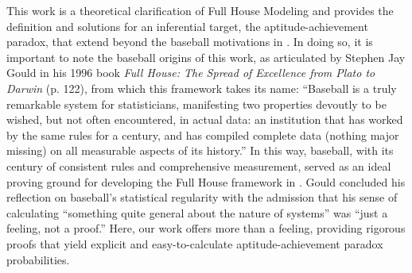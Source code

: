 \documentclass[12pt]{article}
\begin{document}
This work is a theoretical clarification of Full House Modeling and provides the definition and solutions for an inferential target, the aptitude-achievement paradox, that extend beyond the baseball motivations in \cite{yan2025comparing}. In doing so, it is important to note the baseball origins of this work, as articulated by Stephen Jay Gould in his 1996 book \emph{Full House: The Spread of Excellence from Plato to Darwin} (p. 122), from which this framework takes its name: ``Baseball is a truly remarkable system for statisticians, manifesting two properties devoutly to be wished, but not often encountered, in actual data: an institution that has worked by the same rules for a century, and has compiled complete data (nothing major missing) on all measurable aspects of its history.'' In this way, baseball, with its century of consistent rules and comprehensive measurement, served as an ideal proving ground for developing the Full House framework in \cite{yan2025comparing}. 
Gould concluded his reflection on baseball's statistical regularity with the admission that his sense of calculating ``something quite general about the nature of systems'' was ``just a feeling, not a proof.'' Here, our work offers more than a feeling, providing rigorous proofs that yield explicit and easy-to-calculate aptitude-achievement paradox probabilities.
\end{document}
